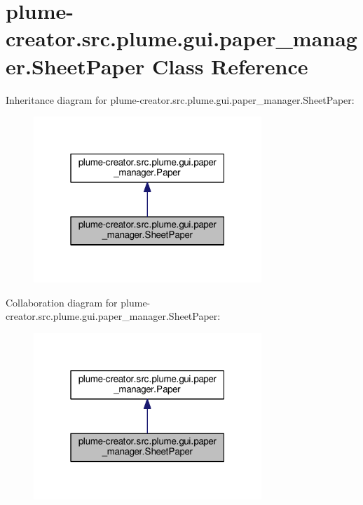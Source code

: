 \hypertarget{classplume-creator_1_1src_1_1plume_1_1gui_1_1paper__manager_1_1_sheet_paper}{}\section{plume-\/creator.src.\+plume.\+gui.\+paper\+\_\+manager.\+Sheet\+Paper Class Reference}
\label{classplume-creator_1_1src_1_1plume_1_1gui_1_1paper__manager_1_1_sheet_paper}


Inheritance diagram for plume-\/creator.src.\+plume.\+gui.\+paper\+\_\+manager.\+Sheet\+Paper\+:\nopagebreak
\begin{figure}[H]
\begin{center}
\leavevmode
\includegraphics[width=244pt]{classplume-creator_1_1src_1_1plume_1_1gui_1_1paper__manager_1_1_sheet_paper__inherit__graph}
\end{center}
\end{figure}


Collaboration diagram for plume-\/creator.src.\+plume.\+gui.\+paper\+\_\+manager.\+Sheet\+Paper\+:\nopagebreak
\begin{figure}[H]
\begin{center}
\leavevmode
\includegraphics[width=244pt]{classplume-creator_1_1src_1_1plume_1_1gui_1_1paper__manager_1_1_sheet_paper__coll__graph}
\end{center}
\end{figure}
